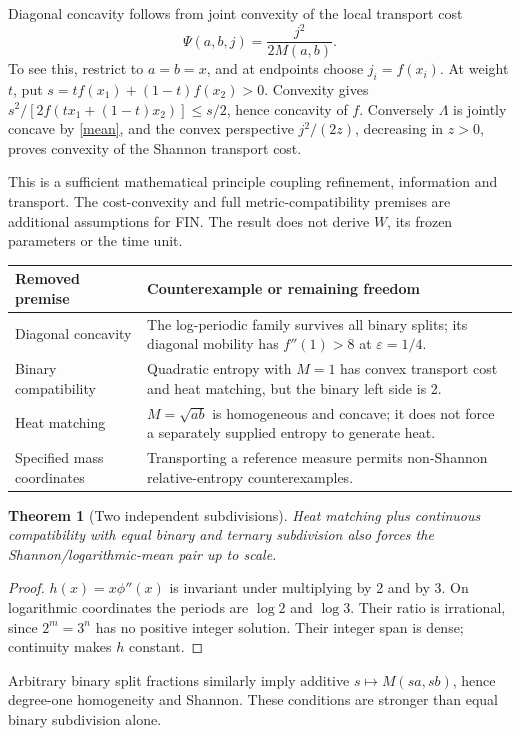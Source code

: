 \documentclass[11pt,a4paper]{article}
\newtheorem{theorem}{Theorem}
\begin{document}
Diagonal concavity follows from joint convexity of the local transport cost
\[
\Psi(a,b,j)=\frac{j^2}{2M(a,b)}.
\]
To see this, restrict to \(a=b=x\), and at endpoints choose
\(j_i=f(x_i)\). At weight \(t\), put \(s=tf(x_1)+(1-t)f(x_2)>0\).
Convexity gives \(s^2/[2f(tx_1+(1-t)x_2)]\le s/2\), hence concavity of \(f\).
Conversely \(\Lambda\) is jointly concave by \eqref{mean}, and the convex
perspective \(j^2/(2z)\), decreasing in \(z>0\), proves convexity of the
Shannon transport cost.

This is a sufficient mathematical principle coupling refinement, information
and transport. The cost-convexity and full metric-compatibility premises are
additional assumptions for FIN. The result does not derive \(W\), its frozen
parameters or the time unit.

\begin{longtable}{p{}p{}}
\toprule
Removed premise & Counterexample or remaining freedom\\
\midrule\endhead
Diagonal concavity & The log-periodic family survives all binary splits;
its diagonal mobility has \(f''(1)>8\) at \(\varepsilon=1/4\).\\
Binary compatibility & Quadratic entropy with \(M=1\) has convex transport
cost and heat matching, but the binary left side is 2.\\
Heat matching & \(M=\sqrt{ab}\) is homogeneous and concave; it does not force
a separately supplied entropy to generate heat.\\
Specified mass coordinates & Transporting a reference measure permits
non-Shannon relative-entropy counterexamples.\\
\bottomrule
\end{longtable}

\begin{theorem}[Two independent subdivisions]
Heat matching plus continuous compatibility with equal binary and ternary
subdivision also forces the Shannon/logarithmic-mean pair up to scale.
\end{theorem}
\begin{proof}
\(h(x)=x\phi''(x)\) is invariant under multiplying by 2 and by 3.
On logarithmic coordinates the periods are \(\log2\) and \(\log3\).
Their ratio is irrational, since \(2^m=3^n\) has no positive integer
solution. Their integer span is dense; continuity makes \(h\) constant.
\end{proof}

Arbitrary binary split fractions similarly imply additive
\(s\mapsto M(sa,sb)\), hence degree-one homogeneity and Shannon. These
conditions are stronger than equal binary subdivision alone.
\end{document}
